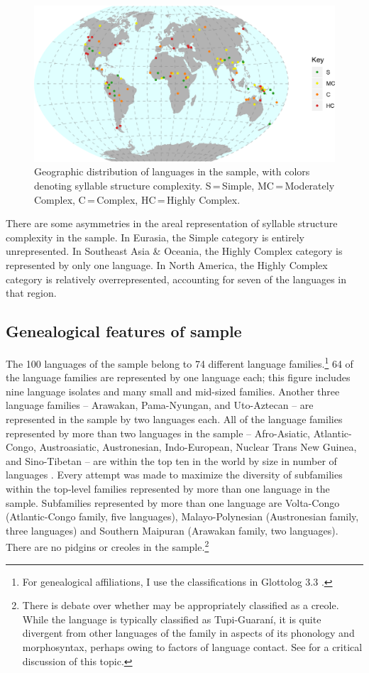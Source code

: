 \begin{figure}
\includegraphics[width=\textwidth]{figures/fig21.png}
\caption{\label{fig:2.1}Geographic distribution of languages in the sample, with colors denoting syllable structure complexity. S\,=\,Simple, MC\,=\,Moderately Complex, C\,=\,Complex, HC\,=\,Highly Complex.}
\end{figure}

  There are some asymmetries in the areal representation of syllable structure complexity in the sample. In Eurasia, the Simple category is entirely unrepresented. In Southeast Asia \& Oceania, the Highly Complex category is represented by only one language. In North America, the Highly Complex category is relatively overrepresented, accounting for seven of the languages in that region.

\subsection{Genealogical features of sample}\label{sec:2.4.2}

  The 100 languages of the sample belong to 74 different language families.\footnote{{For genealogical affiliations, I use the classifications in Glottolog 3.3 \citep{HammarströmEtAl2018}.}} 64 of the language families are represented by one language each; this figure includes nine language isolates and many small and mid-sized families. Another three language families -- Arawakan, Pama-Nyungan, and Uto-Aztecan -- are represented in the sample by two languages each. All of the language families represented by more than two languages in the sample -- Afro-Asiatic, Atlantic-Congo, Austroasiatic, Austronesian, Indo-European, Nuclear Trans New Guinea, and Sino-Tibetan -- are within the top ten in the world by size in number of languages \citep{HammarströmEtAl2018}. Every attempt was made to maximize the diversity of subfamilies within the top-level families represented by more than one language in the sample. Subfamilies represented by more than one language are Volta-Congo (Atlantic-Congo family, five languages), Malayo-Polynesian (Austronesian family, three languages) and Southern Maipuran (Arawakan family, two languages). There are no pidgins or creoles in the sample.\footnote{{There is debate over whether  may be appropriately classified as a creole. While the language is typically classified as Tupi-Guaraní, it is quite divergent from other languages of the family in aspects of its phonology and morphosyntax, perhaps owing to factors of language contact. See  \citet{VallejosYopán2010} for a critical discussion of this topic.}}

